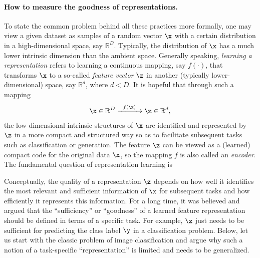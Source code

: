 \documentclass[../../book-main.tex]{subfiles}
\begin{document}
\paragraph{How to measure the goodness of representations.}
To state the common problem behind all these practices more formally, one may view a given dataset as samples of a random vector $\x$ with a certain distribution in a high-dimensional space, say $\mathbb{R}^D$. Typically, the distribution of $\x$ has a much lower intrinsic dimension than the ambient space. Generally speaking,  {\em learning a representation} refers to learning a continuous mapping, say $f(\cdot)$, that transforms $\x$ to a so-called {\em feature vector} $\z$ in another (typically lower-dimensional) space, say $\mathbb{R}^d$, where $d < D$. It is hopeful that through such a mapping
\begin{equation}
	\x \in \mathbb{R}^D \xrightarrow{\hspace{2mm} f(\x)\hspace{2mm}} \z  \in \mathbb{R}^d,
	\label{eqn:chap4-1-encoding}
\end{equation}
the low-dimensional intrinsic structures of $\x$ are identified and represented by $\z$ in a more compact and structured way so as to facilitate subsequent tasks such as classification or generation. The feature $\z$ can be viewed as a (learned) compact code for the original data $\x$, so the mapping $f$ is also called an \textit{encoder}.
The fundamental question of representation learning is
\begin{center}
\end{center}

Conceptually, the quality of a representation $\z$ depends on how well it identifies the most relevant and sufficient information of $\x$ for subsequent tasks and how efficiently it represents this information.
For a long time, it was believed and argued that the ``sufficiency'' or ``goodness'' of a learned feature representation should be defined in terms of a specific task. For example, $\z$ just needs to be sufficient for predicting the class label $\y$ in a classification problem. Below, let us start with the classic problem of image classification and argue why such a notion of a task-specific ``representation'' is limited and needs to be generalized.

\end{document}
